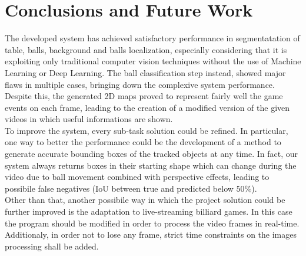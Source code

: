\section{Conclusions and Future Work}


The developed system has achieved satisfactory performance in segmentatation of table, balls, background and balls localization, especially considering 
that it is exploiting only traditional computer vision techniques without the use of Machine Learning or Deep Learning.
The ball classification step instead, showed major flaws in multiple cases, bringing down the complexive system performance. 
Despite this, the generated 2D maps proved to represent fairly well the game events on each frame, leading to the creation of a modified version
of the given videos in which useful informations are shown. 
\newline \\
To improve the system, every sub-task solution could be refined.
In particular, one way to better the performance could be the development of a method to generate accurate bounding boxes
of the tracked objects at any time. In fact, our system always returns boxes in their starting shape which can change during the video due to ball
movement combined with perspective effects, leading to possibile false negatives (IoU between true and predicted below $50\%$).
\newline \\
Other than that, another possibile way in which the project solution could be further improved is the adaptation to live-streaming billiard games. In this case the program should be modified
in order to process the video frames in real-time. Additionaly, in order not to lose any frame, strict time constraints on the images processing shall be added. 
